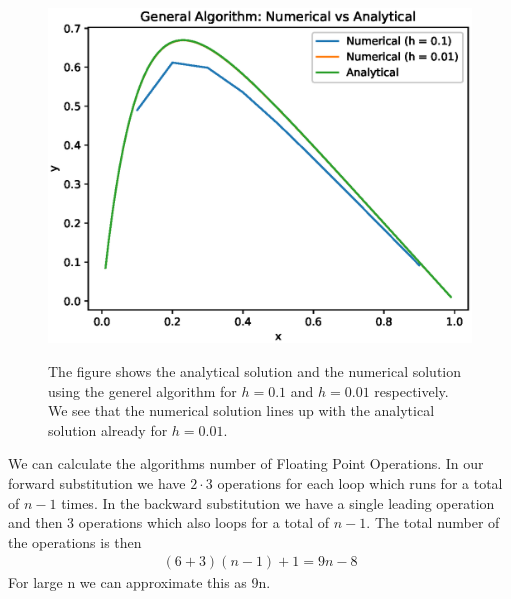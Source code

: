 \documentclass[american,a4paper,12pt]{article}
\begin{document}
\begin{figure}[H]
\begin{center}
  \includegraphics[width = \textwidth]{figures/general_algo_example.eps} \\
  \caption{The figure shows the analytical solution and the numerical solution using the generel algorithm for $h = 0.1$ and $h = 0.01$ respectively. We see that the numerical solution lines up with the analytical solution already for $h = 0.01$.}
  \label{fig:general_ex}
  \end{center}
\end{figure}
We can calculate the algorithms number of Floating Point Operations. In our forward substitution we have $2 \cdot 3$ operations for each loop which runs for a total of $n-1$ times. In the backward substitution we have a single leading operation and then 3 operations which also loops for a total of $n-1$. The total number of the operations is then
\begin{align*}
  (6 + 3)(n - 1) + 1 = 9n - 8
\end{align*}
For large n we can approximate this as 9n.
\end{document}
